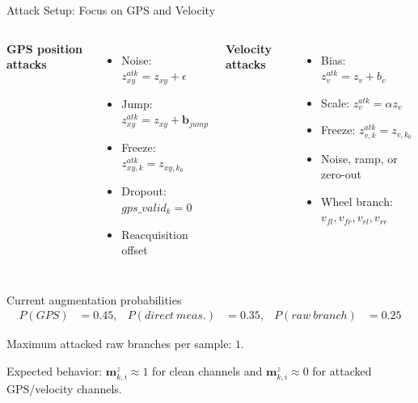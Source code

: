 \documentclass[aspectratio=169,11pt]{beamer}
\begin{document}
\begin{frame}{Attack Setup: Focus on GPS and Velocity}
  \small
  \begin{columns}[T,onlytextwidth]
    \textbf{GPS position attacks}
    \begin{itemize}
      \item Noise: $z_{xy}^{atk}=z_{xy}+\epsilon$
      \item Jump: $z_{xy}^{atk}=z_{xy}+\bm{b}_{jump}$
      \item Freeze: $z_{xy,k}^{atk}=z_{xy,k_0}$
      \item Dropout: $gps\_valid_k=0$
      \item Reacquisition offset
    \end{itemize}

    \textbf{Velocity attacks}
    \begin{itemize}
      \item Bias: $z_v^{atk}=z_v+b_v$
      \item Scale: $z_v^{atk}=\alpha z_v$
      \item Freeze: $z_{v,k}^{atk}=z_{v,k_0}$
      \item Noise, ramp, or zero-out
      \item Wheel branch: $v_{fl},v_{fr},v_{rl},v_{rr}$
    \end{itemize}
  \end{columns}

  \vspace{0.3em}
  \begin{block}{Current augmentation probabilities}
    \vspace{-0.5em}
    \[
      \begin{aligned}
      P(GPS)&=0.45, &
      P(direct\ meas.)&=0.35, &
      P(raw\ branch)&=0.25
      \end{aligned}
    \]
    \vspace{-0.8em}

    Maximum attacked raw branches per sample: $1$.
  \end{block}

  Expected behavior:
  $\bm{m}_{k,i}^{z}\approx 1$ for clean channels and
  $\bm{m}_{k,i}^{z}\approx 0$ for attacked GPS/velocity channels.

\end{frame}
\end{document}
